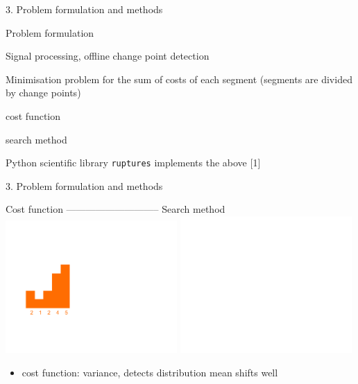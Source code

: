 \documentclass[first=orange,second=blue,logo=blueque]{aaltoslides}
\newcommand{\SubItem}[1]{
    {\setlength\itemindent{15pt} \item[$\bullet$] #1}
}
\begin{document}

\begin{frame}{3. Problem formulation and methods}
    \begin{block}{{\color{black}Problem formulation}}
        \begin{itemize}
            \item Signal processing, offline change point detection %
            \item Minimisation problem for the sum of costs of each segment (segments are divided by change points)
                \SubItem{cost function}
                \SubItem{search method}
            \item Python scientific library \texttt{ruptures} implements the above [1]
        \end{itemize}
    \end{block}
\end{frame}


\begin{frame}{3. Problem formulation and methods}
    \begin{block}{ {\color{black}Cost function} {\color{white}-----------------------------} {\color{white}Search method}}
        \includegraphics[width=0.49\textwidth]{figures/costfunction.pdf}
        \includegraphics[width=0.49\textwidth]{figures/searchmethod_invisible.pdf}\\
        \vspace{-1cm} \hspace{0.5cm}
        \color{orange}{$\sigma^2=2,7$}
        \begin{itemize}
            \item \alert{cost function}: variance, detects distribution mean shifts well
        \end{itemize}
    \end{block}
\end{frame}
\end{document}
